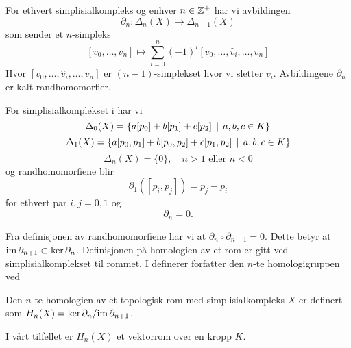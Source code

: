 \begin{definisjon}\label{def:randhom}
  For ethvert simplisialkompleks og enhver $n\in\mathbb{Z}^+$
  har vi avbildingen 
  \[\partial_n: \Delta_n(X)\to\Delta_{n-1}(X)\]
  som sender et $n$-simpleks
  \[[v_0,\dots,v_n]\mapsto
  \sum_{i=0}^n(-1)^i[v_0,\dots,\hat{v}_i,\dots,v_n]\]
  Hvor $[v_0,\dots,\hat{v}_i,\dots,v_n]$ er
  $(n-1)$-simplekset hvor vi sletter $v_i$. Avbildingene
  $\partial_n$ er kalt randhomomorfier.
\end{definisjon}

\begin{eksempel}\label{eks:randhom}
  For simplisialkomplekset i 
  har vi
  \[\Delta_0(X) = \left\{a[p_0]+b[p_1]+c[p_2]\,\mid\,a,b,c\in K\right\}\]
  \[\Delta_1(X)
  = \left\{a[p_0,p_1]+b[p_0,p_2]+c[p_1,p_2]\,\mid\,a,b,c\in K\right\}\]
  \[\Delta_n(X) = \{0\},\quad n>1\text{ eller } n<0\]
  og randhomomorfiene blir
  \[\partial_1([p_i,p_j]) = p_j-p_i\]
  for ethvert par $i,j=0,1$ og
  \[\partial_n = 0.\]
\end{eksempel}

Fra definisjonen av randhomomorfiene har vi at
$\partial_n\circ\partial_{n+1}=0$. Dette betyr at
$\textnormal{im}\,\partial_{n+1}\subset\ker\partial_n$.
Definisjonen på homologien av et rom er gitt ved
simplisialkomplekset til rommet. I \citep[seksjon
2.1]{Hatcher2001} definerer forfatter den $n$-te
  homologigruppen ved

\begin{definisjon}\label{def:Homologi}
  Den $n$-te homologien av et topologisk rom med
  simplisialkompleks $X$ er definert
  som $H_n(X) = \ker\partial_n/\textnormal{im}\,\partial_{n+1}$.
\end{definisjon}

I vårt tilfellet er $H_n(X)$ et vektorrom over en kropp
$K$.

